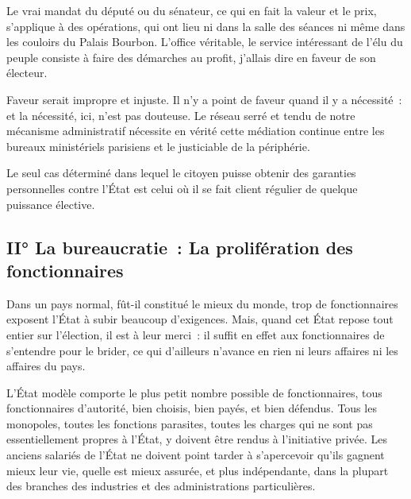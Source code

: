 \documentclass[french,twoside]{book} %
\newcommand{\astermono}{\medskip\centerline{\color{rubric}\large\selectfont{\syms ✻}}\medskip\par}%
\begin{document}
Le vrai mandat du député ou du sénateur, ce qui en fait la valeur et le prix, s’applique à des opérations, qui ont lieu ni dans la salle des séances ni même dans les couloirs du Palais Bourbon. L’office véritable, le service intéressant de l’élu du peuple consiste à faire des démarches au profit, j’allais dire en faveur de son électeur.\par
Faveur serait impropre et injuste. Il n’y a point de faveur quand il y a nécessité : et la nécessité, ici, n’est pas douteuse. Le réseau serré et tendu de notre mécanisme administratif nécessite en vérité cette médiation continue entre les bureaux ministériels parisiens et le justiciable de la périphérie.\par

\astermono

\noindent Le seul cas déterminé dans lequel le citoyen puisse obtenir des garanties personnelles contre l’État est celui où il se fait client régulier de quelque puissance élective.
\subsection[II° La bureaucratie : La prolifération des fonctionnaires]{II° La bureaucratie : La prolifération des fonctionnaires}
\noindent Dans un pays normal, fût-il constitué le mieux du monde, trop de fonctionnaires exposent l’État à subir beaucoup d’exigences. Mais, quand cet État repose tout entier sur l’élection, il est à leur merci : il suffit en effet aux fonctionnaires de s’entendre pour le brider, ce qui d’ailleurs n’avance en rien ni leurs affaires ni les affaires du pays.\par
L’État modèle comporte le plus petit nombre possible de fonctionnaires, tous fonctionnaires d’autorité, bien choisis, bien payés, et bien défendus. Tous les monopoles, toutes les fonctions parasites, toutes les charges qui ne sont pas essentiellement propres à l’État, y doivent être rendus à l’initiative privée. Les anciens salariés de l’État ne doivent point tarder à s’apercevoir qu’ils gagnent mieux leur vie, quelle est mieux assurée, et plus indépendante, dans la plupart des branches des industries et des administrations particulières.\par

\astermono
\end{document}
